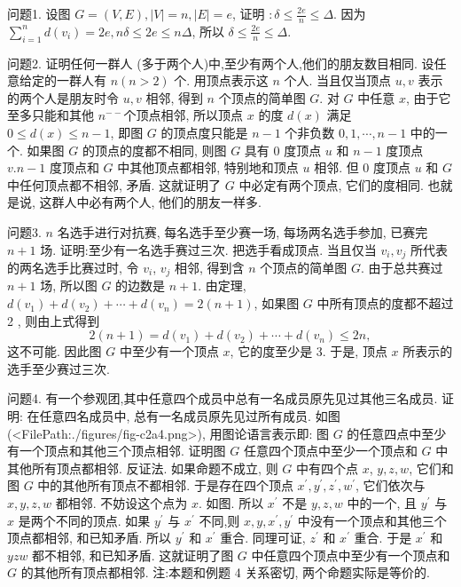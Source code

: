 
问题1. 设图 $G=(V, E),|V|=n,|E|=e$, 证明 $: \delta \leqslant \frac{2 e}{n} \leqslant \Delta$.
因为 $\sum_{i=1}^n d\left(v_i\right)=2 e, n \delta \leqslant 2 e \leqslant n \Delta$, 所以 $\delta \leqslant \frac{2 e}{n} \leqslant \Delta$.



问题2. 证明任何一群人 (多于两个人)中,至少有两个人,他们的朋友数目相同.
设任意给定的一群人有 $n(n>2)$ 个.
用顶点表示这 $n$ 个人.
当且仅当顶点 $u, v$ 表示的两个人是朋友时令 $u, v$ 相邻, 得到 $n$ 个顶点的简单图 $G$.
对 $G$ 中任意 $x$, 由于它至多只能和其他 $n^{--}$个顶点相邻, 所以顶点 $x$ 的度 $d(x)$ 满足 $0 \leqslant d(x) \leqslant n-1$, 即图 $G$ 的顶点度只能是 $n-1$ 个非负数 $0,1, \cdots, n-1$ 中的一个.
如果图 $G$ 的顶点的度都不相同, 则图 $G$ 具有 0 度顶点 $u$ 和 $n-1$ 度顶点 $v . n-1$ 度顶点和 $G$ 中其他顶点都相邻, 特别地和顶点 $u$ 相邻.
但 0 度顶点 $u$ 和 $G$ 中任何顶点都不相邻, 矛盾.
这就证明了 $G$ 中必定有两个顶点, 它们的度相同.
也就是说, 这群人中必有两个人, 他们的朋友一样多.



问题3. $n$ 名选手进行对抗赛, 每名选手至少赛一场, 每场两名选手参加, 已赛完 $n+1$ 场.
证明:至少有一名选手赛过三次.
把选手看成顶点.
当且仅当 $v_i, v_j$ 所代表的两名选手比赛过时, 令 $v_i$, $v_j$ 相邻, 得到含 $n$ 个顶点的简单图 $G$. 由于总共赛过 $n+1$ 场, 所以图 $G$ 的边数是 $n+1$.
由定理, $d\left(v_1\right)+d\left(v_2\right)+\cdots+d\left(v_n\right)=2(n+1)$,
如果图 $G$ 中所有顶点的度都不超过 2 , 则由上式得到
$$
2(n+1)=d\left(v_1\right)+d\left(v_2\right)+\cdots+d\left(v_n\right) \leqslant 2 n,
$$
这不可能.
因此图 $G$ 中至少有一个顶点 $x$, 它的度至少是 3. 于是, 顶点 $x$ 所表示的选手至少赛过三次.



问题4. 有一个参观团,其中任意四个成员中总有一名成员原先见过其他三名成员.
证明: 在任意四名成员中, 总有一名成员原先见过所有成员.
如图(<FilePath:./figures/fig-c2a4.png>), 用图论语言表示即: 图 $G$ 的任意四点中至少有一个顶点和其他三个顶点相邻.
证明图 $G$ 任意四个顶点中至少一个顶点和 $G$ 中其他所有顶点都相邻.
反证法.
如果命题不成立, 则 $G$ 中有四个点 $x$, $y, z, w$, 它们和图 $G$ 中的其他所有顶点不都相邻.
于是存在四个顶点 $x^{\prime}, y^{\prime}, z^{\prime}, w^{\prime}$, 它们依次与 $x, y, z, w$ 都相邻.
不妨设这个点为 $x$. 如图.
所以 $x^{\prime}$ 不是 $y, z, w$ 中的一个, 且 $y^{\prime}$ 与 $x$ 是两个不同的顶点.
如果 $y^{\prime}$ 与 $x^{\prime}$ 不同,则 $x, y, x^{\prime}, y^{\prime}$ 中没有一个顶点和其他三个顶点都相邻, 和已知矛盾.
所以 $y^{\prime}$ 和 $x^{\prime}$ 重合.
同理可证, $z^{\prime}$ 和 $x^{\prime}$ 重合.
于是 $x^{\prime}$ 和 $y z w$ 都不相邻, 和已知矛盾.
这就证明了图 $G$ 中任意四个顶点中至少有一个顶点和 $G$ 的其他所有顶点都相邻.
注:本题和例题 4 关系密切, 两个命题实际是等价的.



